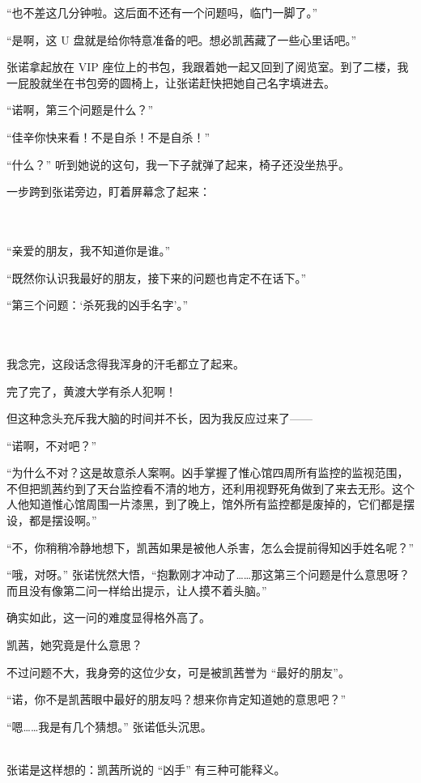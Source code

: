 \documentclass[UTF8]{ctexart}
\begin{document}
“也不差这几分钟啦。这后面不还有一个问题吗，临门一脚了。”

“是啊，这 U 盘就是给你特意准备的吧。想必凯茜藏了一些心里话吧。”

张诺拿起放在 VIP 座位上的书包，我跟着她一起又回到了阅览室。到了二楼，我一屁股就坐在书包旁的圆椅上，让张诺赶快把她自己名字填进去。

“诺啊，第三个问题是什么？”

“佳辛你快来看！不是自杀！不是自杀！”

“什么？” 听到她说的这句，我一下子就弹了起来，椅子还没坐热乎。

一步跨到张诺旁边，盯着屏幕念了起来：

~\\
~\\

“亲爱的朋友，我不知道你是谁。”

“既然你认识我最好的朋友，接下来的问题也肯定不在话下。”

“第三个问题：‘杀死我的凶手名字’。”

~\\
~\\

我念完，这段话念得我浑身的汗毛都立了起来。

完了完了，黄渡大学有杀人犯啊！

但这种念头充斥我大脑的时间并不长，因为我反应过来了——

“诺啊，不对吧？”

“为什么不对？这是故意杀人案啊。凶手掌握了惟心馆四周所有监控的监视范围，不但把凯茜约到了天台监控看不清的地方，还利用视野死角做到了来去无形。这个人他知道惟心馆周围一片漆黑，到了晚上，馆外所有监控都是废掉的，它们都是摆设，都是摆设啊。”

“不，你稍稍冷静地想下，凯茜如果是被他人杀害，怎么会提前得知凶手姓名呢？”

“哦，对呀。” 张诺恍然大悟，“抱歉刚才冲动了……那这第三个问题是什么意思呀？而且没有像第二问一样给出提示，让人摸不着头脑。”

确实如此，这一问的难度显得格外高了。

凯茜，她究竟是什么意思？

不过问题不大，我身旁的这位少女，可是被凯茜誉为 “最好的朋友”。

“诺，你不是凯茜眼中最好的朋友吗？想来你肯定知道她的意思吧？”

“嗯……我是有几个猜想。” 张诺低头沉思。

~\\

张诺是这样想的：凯茜所说的 “凶手” 有三种可能释义。
\end{document}
